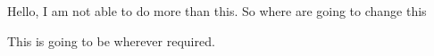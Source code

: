 \documentclass{article}
\begin{document}
Hello, I am not able to do more than this. So where are going to change this

This is going to be wherever required.
\end{document}

